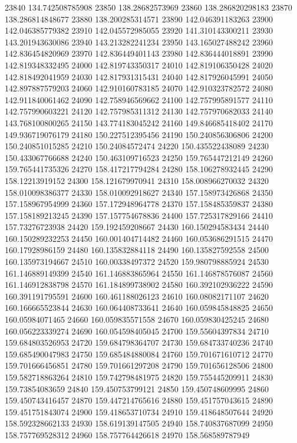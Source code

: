 {23840 134.742508785908
23850 138.28682573969
23860 138.286820298183
23870 138.286814848677
23880 138.200285314571
23890 142.046391183263
23900 142.046385779382
23910 142.045572985055
23920 141.310143300211
23930 143.201943630086
23940 143.213282241234
23950 143.165027488242
23960 142.836454820969
23970 142.836449401143
23980 142.836444018891
23990 142.819348332495
24000 142.819743350317
24010 142.819106350428
24020 142.818492041959
24030 142.817931315431
24040 142.817926045991
24050 142.897887579203
24060 142.910160783185
24070 142.910323782572
24080 142.911840061462
24090 142.758946569662
24100 142.757995891577
24110 142.757990603221
24120 142.757985311312
24130 142.757970682033
24140 143.768100800265
24150 143.774183045242
24160 149.846685418402
24170 149.936719076179
24180 150.227512395456
24190 150.240856306806
24200 150.240851015285
24210 150.24084572474
24220 150.435522438089
24230 150.433067766688
24240 150.463109716523
24250 159.765447212149
24260 159.765441735326
24270 158.417217794284
24280 158.106278932445
24290 158.12213919152
24300 158.121679970941
24310 158.008966270032
24320 158.010098386377
24330 158.010092918627
24340 157.158973426868
24350 157.158967954999
24360 157.172948964778
24370 157.158485359837
24380 157.158189213245
24390 157.157754678836
24400 157.725317829166
24410 157.73276723938
24420 159.192459208667
24430 160.150294583434
24440 160.150289232253
24450 160.001404714482
24460 160.053686291515
24470 160.17928986159
24480 160.135832884118
24490 160.135827592558
24500 160.135973194667
24510 160.00338497372
24520 159.980798885924
24530 161.146889149399
24540 161.146883865964
24550 161.146878576087
24560 161.146912838798
24570 161.184899738902
24580 160.392102936222
24590 160.391191795591
24600 160.461188026123
24610 160.08082171107
24620 160.166665523844
24630 160.064408733641
24640 160.059845848825
24650 160.05984071465
24660 160.059835571558
24670 160.059830425245
24680 160.056223339274
24690 160.054598405045
24700 159.55604397834
24710 159.684803526953
24720 159.684798364707
24730 159.684733740236
24740 159.685490047983
24750 159.685484880084
24760 159.701671610712
24770 159.701666456851
24780 159.701661297208
24790 159.701656128506
24800 159.582718863264
24810 159.742798481975
24820 159.755445209911
24830 159.73854083659
24840 159.450753799121
24850 159.450748609995
24860 159.450743416457
24870 159.447214765616
24880 159.451757043615
24890 159.451751843074
24900 159.418653710734
24910 159.418648507644
24920 158.592328662133
24930 158.619139147505
24940 158.740837687099
24950 158.757769528312
24960 158.757764426618
24970 158.568589787949
}
